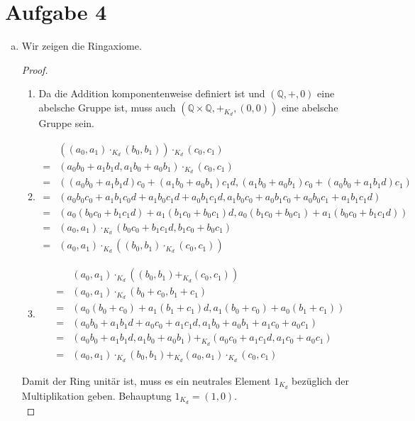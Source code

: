 \documentclass{article}
\begin{document}
	\section*{Aufgabe 4}
	\begin{enumerate}[a)]
		\item Wir zeigen die Ringaxiome.
			\begin{proof}
			\begin{enumerate}[R1)]
				\item Da die Addition komponentenweise definiert ist und $(\mathbb{Q}, +, 0)$ eine abelsche Gruppe ist, muss auch $(\mathbb{Q}\times \mathbb{Q}, +_{K_d}, (0,0))$ eine abelsche Gruppe sein. 
				\item \begin{align*}
					 &((a_0, a_1)\cdot_{K_d} (b_0, b_1)) \cdot_{K_d} (c_0, c_1)\\
					=&(a_0b_0 + a_1b_1d, a_1b_0 + a_0b_1)\cdot_{K_d} (c_0, c_1)\\
					=&\left((a_0b_0 + a_1b_1d)c_0 + (a_1b_0 + a_0b_1)c_1d, (a_1b_0 + a_0b_1)c_0 + (a_0b_0 + a_1b_1d)c_1\right)\\
					=&\left(a_0b_0c_0+a_1b_1c_0d + a_1b_0c_1d + a_0b_1c_1d, a_1b_0c_0 + a_0b_1c_0 + a_0b_0c_1 + a_1b_1c_1d\right)\\
					=&\left(a_0(b_0c_0 + b_1c_1d) + a_1(b_1c_0 + b_0c_1)d, a_0(b_1c_0 + b_0c_1) + a_1(b_0c_0 + b_1c_1d)\right)\\
					=&(a_0,a_1)\cdot_{K_d}(b_0c_0 + b_1c_1d, b_1c_0 + b_0c_1)\\
					=&(a_0,a_1)\cdot_{K_d}((b_0,b_1)\cdot_{K_d}(c_0,c_1))
				\end{align*}
				\item \begin{align*}
					 &(a_0, a_1)\cdot_{K_d}((b_0,b_1) +_{K_d} (c_0, c_1))\\
					=&(a_0, a_1)\cdot_{K_d}(b_0+c_0, b_1+c_1)\\
					=&(a_0(b_0+c_0) + a_1(b_1+c_1)d, a_1(b_0+c_0) + a_0(b_1+c_1))\\
					=&(a_0b_0 + a_1b_1d + a_0c_0 + a_1c_1d, a_1b_0 + a_0b_1 + a_1c_0 + a_0c_1)\\
					=&(a_0b_0 + a_1b_1d, a_1b_0 + a_0b_1) +_{K_d} (a_0c_0 + a_1c_1d, a_1c_0 + a_0c_1)\\
					=&(a_0, a_1) \cdot_{K_d} (b_0,b_1) +_{K_d} (a_0, a_1)\cdot_{K_d} (c_0, c_1)
				\end{align*}
			\end{enumerate}
			Damit der Ring unitär ist, muss es ein neutrales Element $1_{K_d}$ bezüglich der Multiplikation geben. Behauptung $1_{K_d} = (1,0)$.\\

\end{proof}
\end{enumerate}
\end{document}
